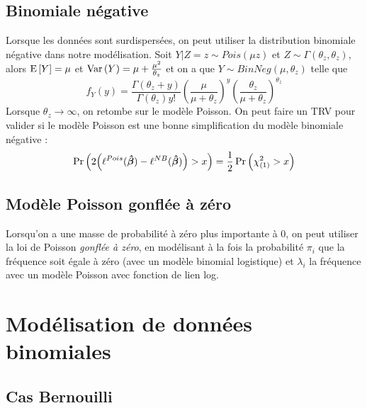 \documentclass[10pt, french]{article}
\begin{document}
\begin{multicols*}{3}
\subsection*{Binomiale négative}
Lorsque les données sont surdispersées, on peut utiliser la distribution binomiale négative dans notre modélisation. Soit $Y | Z = z \sim Pois(\mu z)$ et $Z \sim \Gamma(\theta_z, \theta_z)$, alors $\mathrm{E} \left[ Y \right] = \mu$ et $\mathrm{Var} \left( Y \right) = \mu + \frac{\mu^2}{\theta_z}$ et on a que $Y \sim BinNeg(\mu, \theta_z)$ telle que
\[f_Y(y) = \frac{\Gamma(\theta_z + y)}{\Gamma(\theta_z) y!} \left( \frac{\mu}{\mu + \theta_z} \right)^{y} \left( \frac{\theta_z}{\mu + \theta_z} \right)^{\theta_z}  \]
Lorsque $\theta_z \to \infty$, on retombe sur le modèle Poisson. On peut faire un TRV pour valider si le modèle Poisson est une bonne simplification du modèle binomiale négative : 
\[ \Pr \left(  2\Big(\ell^{Pois}(\bm{\hat{\beta}}) - \ell^{NB}(\bm{\hat{\beta}}) \Big) > x \right) = \frac{1}{2} \Pr \left( \chi_{(1)}^2 > x \right) \] 

\subsection*{Modèle Poisson gonflée à zéro}
Lorsqu'on a une masse de probabilité à zéro plus importante à 0, on peut utiliser la loi de Poisson \emph{gonflée à zéro}, en modélisant à la fois la probabilité $\pi_i$ que la fréquence soit égale à zéro (avec un modèle binomial logistique) et $\lambda_i$ la fréquence avec un modèle Poisson avec fonction de lien log.


\section{Modélisation de données binomiales}





\subsection{Cas Bernouilli}


\end{multicols*}
\end{document}
